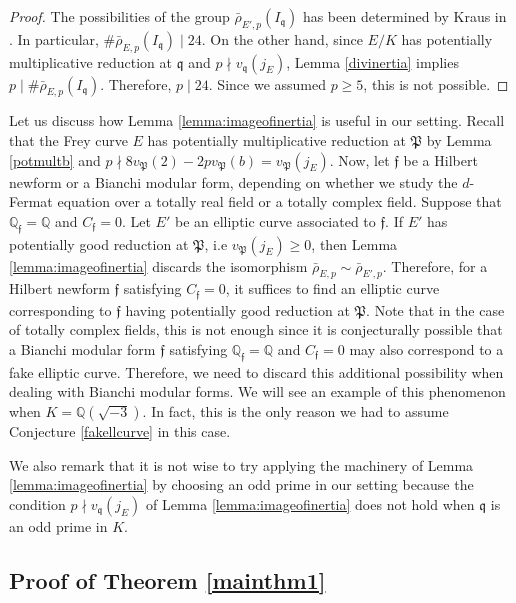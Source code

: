 \documentclass[]{article}
\newcommand {\QQ}{{\mathbb{Q}}}
\newcommand {\mfp}{{\mathfrak{P}}}
\begin{document}
\begin{proof}
    The possibilities of the group $\bar{\rho}_{E', p}\left(I_{\mathfrak{q}}\right)$ has been determined by Kraus in \cite{Kraus1990}. In particular, $\# \bar{\rho}_{E, p}\left(I_{\mathfrak{q}}\right)\mid 24$. On the other hand, since $E/K$ has potentially multiplicative reduction at $\mathfrak{q}$ and $p\nmid v_{\mathfrak{q}}(j_E)$, Lemma \ref{divinertia} implies $p\mid \# \bar{\rho}_{E, p}\left(I_{\mathfrak{q}}\right)$. Therefore, $p\mid 24$. Since we assumed $p\ge 5$, this is not possible.
\end{proof}

Let us discuss how Lemma \ref{lemma:imageofinertia} is useful in our setting. Recall that the Frey curve $E$ has potentially multiplicative reduction at $\mfp$ by Lemma \ref{potmultb} and $p\nmid 8v_{\mfp}(2)-2pv_{\mfp}(b)=v_\mfp(j_E)$. Now, let $\mathfrak{f}$ be a Hilbert newform or a Bianchi modular form, depending on whether we study the $d$-Fermat equation over a totally real field or a totally complex field. Suppose that $\QQ_\mathfrak{f}=\QQ$ and $C_\mathfrak{f}=0$. Let $E'$ be an elliptic curve associated to $\mathfrak{f}$. If $E'$ has potentially good reduction at $\mfp$, i.e $v_\mfp(j_E)\ge 0$, then Lemma \ref{lemma:imageofinertia} discards the isomorphism $\bar{\rho}_{E, p} \sim \bar{\rho}_{E', p}$. Therefore, for a Hilbert newform $\mathfrak{f}$ satisfying $C_\mathfrak{f}=0$, it suffices to find an elliptic curve corresponding to $\mathfrak{f}$ having potentially good reduction at $\mfp$. Note that in the case of totally complex fields, this is not enough since it is conjecturally possible that a Bianchi modular form $\mathfrak{f}$ satisfying $\QQ_\mathfrak{f}=\QQ$ and $C_\mathfrak{f}=0$ may also correspond to a fake elliptic curve. Therefore, we need to discard this additional possibility when dealing with Bianchi modular forms. We will see an example of this phenomenon when $K=\QQ(\sqrt{-3})$. In fact, this is the only reason we had to assume Conjecture \ref{fakellcurve} in this case.

We also remark that it is not wise to try applying the machinery of Lemma \ref{lemma:imageofinertia} by choosing an odd prime in our setting because the condition $p\nmid v_{\mathfrak{q}}(j_E)$ of Lemma \ref{lemma:imageofinertia} does not hold when $\mathfrak{q}$ is an odd prime in $K$.


\subsection{Proof of Theorem \ref{mainthm1}} 
\end{document}
